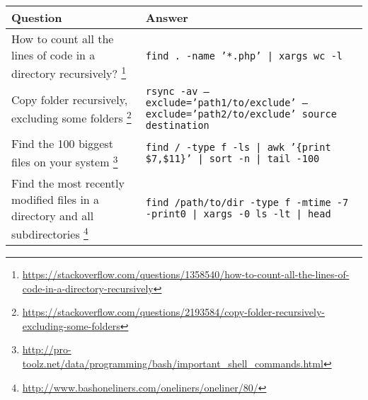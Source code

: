\begin{center}
\begin{tabular}{p{3in}p{3in}}
    \textbf{Question} & \textbf{Answer} \\
    \hline \hline
    How to count all the lines of code in a directory recursively?%
        \footnote{\url{https://stackoverflow.com/questions/1358540/how-to-count-all-the-lines-of-code-in-a-directory-recursively}} &
        \texttt{find . -name '*.php' | xargs wc -l} \\
    \hline
    Copy folder recursively, excluding some folders%
        \footnote{\url{https://stackoverflow.com/questions/2193584/copy-folder-recursively-excluding-some-folders}} &
        \texttt{rsync -av --exclude='path1/to/exclude' --exclude='path2/to/exclude' source destination} \\
     \hline
     Find the 100 biggest files on your system%
         \footnote{\url{http://pro-toolz.net/data/programming/bash/important_shell_commands.html}}&
         \texttt{find / -type f -ls | awk '\{print \$7,\$11\}' | sort -n | tail -100} \\
     \hline
     Find the most recently modified files in a directory and all subdirectories%
         \footnote{\url{http://www.bashoneliners.com/oneliners/oneliner/80/}}&
         \texttt{find /path/to/dir -type f -mtime -7 -print0 | xargs -0 ls -lt | head} \\
\end{tabular}
\end{center}


